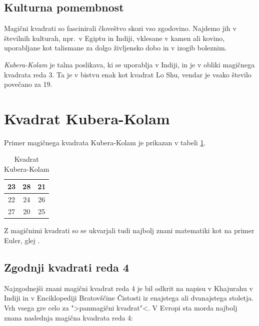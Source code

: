 \documentclass[a4paper,12pt]{article}
\begin{document}

\subsection{Kulturna pomembnost}

Magični kvadrati so fascinirali človeštvo skozi vso zgodovino. Najdemo jih
v številnih kulturah, npr.\ v Egiptu in Indiji, vklesane v kamen ali
kovino, uporabljane kot talismane za dolgo življensko dobo in v
izogib boleznim.

\emph{Kubera-Kolam} je talna poslikava, ki se uporablja v Indiji, in je v
obliki magičnega kvadrata reda 3. Ta je v bistvu enak kot kvadrat
Lo Shu, vendar je vsako število povečano za 19.

\section{Kvadrat Kubera-Kolam}

Primer magičnega kvadrata Kubera-Kolam je prikazan v tabeli \ref{table:kubera}.

\begin{table}[h]
\centering
\caption{Kvadrat Kubera-Kolam}  %
\label{table:kubera}  %
\begin{tabular}{|c|c|c|}
\hline
23 & 28 & 21 \\\hline
22 & 24 & 26 \\\hline
27 & 20 & 25 \\\hline
\end{tabular}
\end{table}


Z magičnimi kvadrati so se ukvarjali tudi najbolj znani matematiki kot na
primer Euler, glej \cite{euler}. %


\subsection{Zgodnji kvadrati reda 4}

Najzgodnejši znani magični kvadrat reda 4 je bil odkrit na napisu
v Khajurahu v Indiji in v Enciklopediji Bratovščine Čistosti iz enajstega
ali dvanajstega stoletja. Vrh vsega gre celo za ">panmagični kvadrat"<.
V Evropi sta morda najbolj znana naslednja magična kvadrata reda 4:
\end{document}

